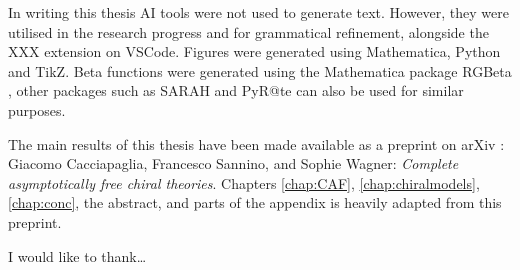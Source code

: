In writing this thesis AI tools were not used to generate text. However, they were utilised in the research progress and for grammatical refinement, alongside the XXX extension on VSCode. Figures were generated using Mathematica, Python and TikZ. Beta functions were generated using the Mathematica package RGBeta \cite{Thomsen:2021ncy}, other packages such as SARAH \cite{Staub:2008uz} and PyR@te \cite{Sartore:2020gou} can also be used for similar purposes. 

The main results of this thesis have been made available as a preprint on arXiv \cite{Cacciapaglia:2026pwh}: Giacomo Cacciapaglia, Francesco Sannino, and Sophie Wagner: \textit{Complete asymptotically free chiral theories}. Chapters \ref{chap:CAF}, \ref{chap:chiralmodels}, \ref{chap:conc}, the abstract, and parts of the appendix is heavily adapted from this preprint. 

I would like to thank\dots